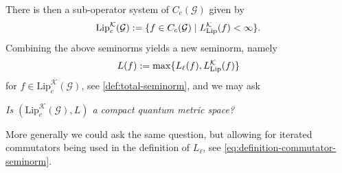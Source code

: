 \documentclass[11pt,a4paper,oneside,final,reqno]{amsart}
\theoremstyle{definition}
\newcommand{\G}{\mathcal{G}}
\newcommand{\cK}{\mathcal{K}}
\newcommand{\Lip}{\mathrm{Lip}}
\numberwithin{equation}{section}
\begin{document}
	
	There is 
	then 
	a  
	sub-operator system of $C_c(\G)$ given by
	\begin{align*}
		\Lip_c^{\cK}(\G) := \{ f \in C_c(\G) \mid L^\cK_{\rm Lip}(f) < \infty \}.
	\end{align*}
	Combining the above seminorms yields a new seminorm, namely
	\begin{align*}
		L (f) := \max \{ L_\ell(f) , L^{\cK}_{\rm Lip}(f)  \}
	\end{align*}
	for 
	$f \in \Lip_c^{\cK}(\G)$, 
	see \cref{def:total-seminorm}, and we may ask
	\begin{center}
		{\it Is 
			$(\Lip_c^{\cK}(\G), L)$ 
			a compact quantum metric space?}
	\end{center}
	More generally we could ask the same question, but allowing for iterated commutators being used in the definition of $L_\ell$, see \eqref{eq:definition-commutator-seminorm}. 
	
\end{document}
